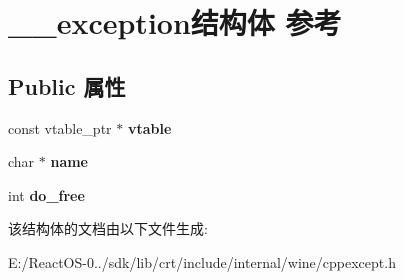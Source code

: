 \hypertarget{struct____exception}{}\section{\+\_\+\+\_\+exception结构体 参考}
\label{struct____exception}
\subsection*{Public 属性}
\begin{DoxyCompactItemize}
\item 
\mbox{\label{struct____exception_a6a49d19aacf946323cdedd4bbf845bf6}} 
const vtable\+\_\+ptr $\ast$ {\bfseries vtable}
\item 
\mbox{\label{struct____exception_a4d7e878ffc52678b17da24c674d26df0}} 
char $\ast$ {\bfseries name}
\item 
\mbox{\label{struct____exception_aca69317ce86216a7a109c5bed9611346}} 
int {\bfseries do\+\_\+free}
\end{DoxyCompactItemize}


该结构体的文档由以下文件生成\+:\begin{DoxyCompactItemize}
\item 
E\+:/\+React\+O\+S-\/0../sdk/lib/crt/include/internal/wine/cppexcept.\+h\end{DoxyCompactItemize}
